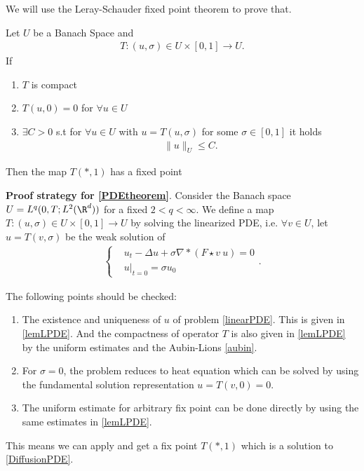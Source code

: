 \vskip5mm
We will use the Leray-Schauder fixed point theorem to prove that. 

 \begin{theorem}\label{schauder_fixpoint}
	Let $U$ be a Banach Space and 
	\begin{align*}
	T: (u,\sigma ) \in  U \times  [0,1] \to U
	.\end{align*}
	If 
	\begin{enumerate}
		\item $T$ is compact 
		\item $T(u,0) = 0$ for $\forall  u \in  U$
		\item  $\exists  C >0$ s.t for $\forall  u \in  U$ with $u=T(u,\sigma )$ for some $\sigma  \in  [0,1]$ it holds 
		\begin{align*}
		\|u\|_{U} \le C
		.\end{align*}
	\end{enumerate}
	Then the map $T(*,1)$ has a fixed point
\end{theorem}
\vskip5mm

{\bf Proof strategy for \autoref{PDEtheorem}}. \label{proofstrategy}
Consider the Banach space $U=L^q(0,T; L^2(\R^d))$ for a fixed $2<q<\infty$. We define a map $T: (u,\sigma ) \in  U \times  [0,1] \to U$ by solving the linearized PDE, i.e. $\forall v\in U$, let $u=T(v,\sigma)$ be the weak solution of 
\begin{align}\label{linearPDE}
\begin{cases}
&u_t - \Delta u + \sigma\nabla*(F \star  v \ u) = 0\\
&u \rvert_{t=0} = \sigma u_{0} 
\end{cases}
.\end{align}

The following points should be checked:
\begin{enumerate}
	\item The existence and uniqueness of $u$ of problem \autoref{linearPDE}. This is given in \autoref{lemLPDE}. And the compactness of operator $T$ is also given in \autoref{lemLPDE} by the uniform estimates and the Aubin-Lions \autoref{aubin}.
	\item For $\sigma=0$, the problem reduces to heat equation which can be solved by using the fundamental solution representation $u=T(v,0)=0$.
	\item The uniform estimate for arbitrary fix point can be done directly by using the same estimates in \autoref{lemLPDE}.
\end{enumerate}
This means we can apply  and get a fix point  $T(*,1)$ which is a solution  to \autoref{DiffusionPDE}.


